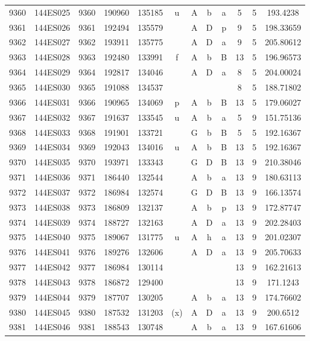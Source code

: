 \begin{tabular}{|*{12}{c|}}
9360 & 144ES025 & 9360 & 190960 & 135185 & u & A & b & a & 5 & 5 & 193.4238 \\ 
9361 & 144ES026 & 9361 & 192494 & 135579 &  & A & D & p & 9 & 5 & 198.33659 \\ 
9362 & 144ES027 & 9362 & 193911 & 135775 &  & A & D & a & 9 & 5 & 205.80612 \\ 
9363 & 144ES028 & 9363 & 192480 & 133991 & f & A & b & B & 13 & 5 & 196.96573 \\ 
9364 & 144ES029 & 9364 & 192817 & 134046 &  & A & D & a & 8 & 5 & 204.00024 \\ 
9365 & 144ES030 & 9365 & 191088 & 134537 &  &  &  &  & 8 & 5 & 188.71802 \\ 
9366 & 144ES031 & 9366 & 190965 & 134069 & p & A & b & B & 13 & 5 & 179.06027 \\ 
9367 & 144ES032 & 9367 & 191637 & 133545 & u & A & b & a & 5 & 9 & 151.75136 \\ 
9368 & 144ES033 & 9368 & 191901 & 133721 &  & G & b & B & 5 & 5 & 192.16367 \\ 
9369 & 144ES034 & 9369 & 192043 & 134016 & u & A & b & B & 13 & 5 & 192.16367 \\ 
9370 & 144ES035 & 9370 & 193971 & 133343 &  & G & D & B & 13 & 9 & 210.38046 \\ 
9371 & 144ES036 & 9371 & 186440 & 132544 &  & A & b & a & 13 & 9 & 180.63113 \\ 
9372 & 144ES037 & 9372 & 186984 & 132574 &  & G & D & B & 13 & 9 & 166.13574 \\ 
9373 & 144ES038 & 9373 & 186809 & 132137 &  & A & b & p & 13 & 9 & 172.87747 \\ 
9374 & 144ES039 & 9374 & 188727 & 132163 &  & A & D & a & 13 & 9 & 202.28403 \\ 
9375 & 144ES040 & 9375 & 189067 & 131775 & u & A & h & a & 13 & 9 & 201.02307 \\ 
9376 & 144ES041 & 9376 & 189276 & 132606 &  & A & D & a & 13 & 9 & 205.70633 \\ 
9377 & 144ES042 & 9377 & 186984 & 130114 &  &  &  &  & 13 & 9 & 162.21613 \\ 
9378 & 144ES043 & 9378 & 186872 & 129400 &  &  &  &  & 13 & 9 & 171.1243 \\ 
9379 & 144ES044 & 9379 & 187707 & 130205 &  & A & b & a & 13 & 9 & 174.76602 \\ 
9380 & 144ES045 & 9380 & 187532 & 131203 & (x) & A & D & a & 13 & 9 & 200.6512 \\ 
9381 & 144ES046 & 9381 & 188543 & 130748 &  & A & b & a & 13 & 9 & 167.61606 \\ 

\end{tabular}
